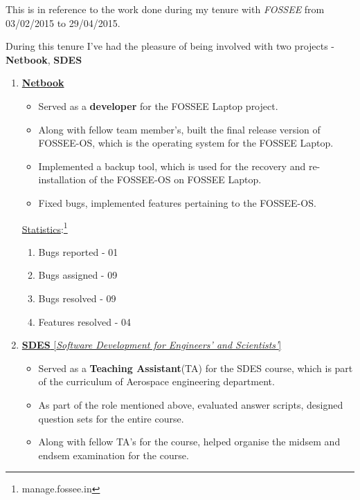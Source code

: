 \documentclass[a4paper,12pt]{report}
\begin{document}

This is in reference to the work done during my tenure with {\it FOSSEE} from 03/02/2015 to 29/04/2015.

During this tenure I've had the pleasure of being involved with two projects - {\bf Netbook}, {\bf SDES}

\renewcommand\theenumi{\Roman{enumi}}
\begin{enumerate}
\item \underline{{\bf Netbook}}
\begin{itemize}
\item Served as a {\bf developer} for the FOSSEE Laptop project.\\
\item Along with fellow team member's, built the final release version of FOSSEE-OS, which is the operating system for the FOSSEE Laptop.\\
\item Implemented a backup tool, which is used for the recovery and re-installation of the FOSSEE-OS on FOSSEE Laptop.\\
\item Fixed bugs, implemented features pertaining to the FOSSEE-OS.\\
\end{itemize}

\underline{Statistics}:\footnote{manage.fossee.in}
\begin{enumerate}
\item Bugs reported - 01
\item Bugs assigned - 09
\item Bugs resolved - 09
\item Features resolved - 04
\end{enumerate}

\item \underline{{\bf SDES} [{\it Software Development for Engineers' and Scientists'}]}
\begin{itemize}
\item Served as a {\bf Teaching Assistant}(TA) for the SDES course, which is part of the curriculum of Aerospace engineering department.\\
\item As part of the role mentioned above, evaluated answer scripts, designed question sets for the entire course.\\
\item Along with fellow TA's for the course, helped organise the midsem and endsem examination for the course.\\
\end{itemize}
\end{enumerate}
\end{document}
